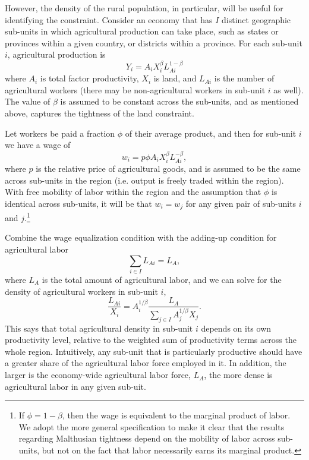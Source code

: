 \documentclass[11pt]{article}
\begin{document}
However, the density of the rural population, in particular, will be useful for identifying the constraint. Consider an economy that has $I$ distinct geographic sub-units in which agricultural production can take place, such as states or provinces within a given country, or districts within a province. For each sub-unit $i$, agricultural production is
\begin{equation}
Y_{i} = A_{i} X_{i}^{\beta} L_{Ai}^{1-\beta}
\end{equation}
where $A_{i}$ is total factor productivity, $X_{i}$ is land, and $L_{Ai}$ is the number of agricultural workers (there may be non-agricultural workers in sub-unit $i$ as well). The value of $\beta$ is assumed to be constant across the sub-units, and as mentioned above, captures the tightness of the land constraint.

Let workers be paid a fraction $\phi$ of their average product, and then for sub-unit $i$ we have a wage of
\begin{equation}
	w_{i} = p \phi A_{i} X_{i}^{\beta} L_{Ai}^{-\beta},
\end{equation}
where $p$ is the relative price of agricultural goods, and is assumed to be the same across sub-units in the region (i.e. output is freely traded within the region). With free mobility of labor within the region and the assumption that $\phi$ is identical across sub-units, it will be that $w_{i} = w_{j}$ for any given pair of sub-units $i$ and $j$.\footnote{If $\phi = 1-\beta$, then the wage is equivalent to the marginal product of labor. We adopt the more general specification to make it clear that the results regarding Malthusian tightness depend on the mobility of labor across sub-units, but not on the fact that labor necessarily earns its marginal product.}

Combine the wage equalization condition with the adding-up condition for agricultural labor 
\begin{equation}
\sum_{i\in I} L_{Ai} = L_A,
\end{equation}
where $L_A$ is the total amount of agricultural labor, and we can solve for the density of agricultural workers in sub-unit $i$,
\begin{equation}
\frac{L_{Ai}}{X_i} = A_{i}^{1/\beta}\frac{L_A}{\sum_{j\in I} A_{j}^{1/\beta}X_{j}}. \label{EQ_LaX}
\end{equation}
This says that total agricultural density in sub-unit $i$ depends on its own productivity level, relative to the weighted sum of productivity terms across the whole region. Intuitively, any sub-unit that is particularly productive should have a greater share of the agricultural labor force employed in it. In addition, the larger is the economy-wide agricultural labor force, $L_A$, the more dense is agricultural labor in any given sub-uit.
\end{document}

